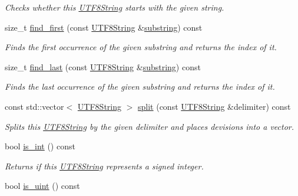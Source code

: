 \begin{DoxyCompactItemize}
\begin{DoxyCompactList}\small\item\em Checks whether this \hyperlink{classchaos_1_1str_1_1_u_t_f8_string}{U\-T\-F8\-String} starts with the given string. \end{DoxyCompactList}\item 
size\-\_\-t \hyperlink{classchaos_1_1str_1_1_u_t_f8_string_a035c9c2a40bcac212ebb20a8524d0b5a}{find\-\_\-first} (const \hyperlink{classchaos_1_1str_1_1_u_t_f8_string}{U\-T\-F8\-String} \&\hyperlink{classchaos_1_1str_1_1_u_t_f8_string_a2d50ab58715264ae175f521816bf670c}{substring}) const 
\begin{DoxyCompactList}\small\item\em Finds the first occurrence of the given substring and returns the index of it. \end{DoxyCompactList}\item 
size\-\_\-t \hyperlink{classchaos_1_1str_1_1_u_t_f8_string_a4053c128303a753735295b441e439933}{find\-\_\-last} (const \hyperlink{classchaos_1_1str_1_1_u_t_f8_string}{U\-T\-F8\-String} \&\hyperlink{classchaos_1_1str_1_1_u_t_f8_string_a2d50ab58715264ae175f521816bf670c}{substring}) const 
\begin{DoxyCompactList}\small\item\em Finds the last occurrence of the given substring and returns the index of it. \end{DoxyCompactList}\item 
const std\-::vector$<$ \hyperlink{classchaos_1_1str_1_1_u_t_f8_string}{U\-T\-F8\-String} $>$ \hyperlink{classchaos_1_1str_1_1_u_t_f8_string_ac5da4c989f6394c38b0fb82a252099db}{split} (const \hyperlink{classchaos_1_1str_1_1_u_t_f8_string}{U\-T\-F8\-String} \&delimiter) const 
\begin{DoxyCompactList}\small\item\em Splits this \hyperlink{classchaos_1_1str_1_1_u_t_f8_string}{U\-T\-F8\-String} by the given delimiter and places devisions into a vector. \end{DoxyCompactList}\item 
\hypertarget{classchaos_1_1str_1_1_u_t_f8_string_a64f529f30034281560805b97826c5e13}{bool \hyperlink{classchaos_1_1str_1_1_u_t_f8_string_a64f529f30034281560805b97826c5e13}{is\-\_\-int} () const }\label{classchaos_1_1str_1_1_u_t_f8_string_a64f529f30034281560805b97826c5e13}

\begin{DoxyCompactList}\small\item\em Returns if this \hyperlink{classchaos_1_1str_1_1_u_t_f8_string}{U\-T\-F8\-String} represents a signed integer. \end{DoxyCompactList}\item 
\hypertarget{classchaos_1_1str_1_1_u_t_f8_string_a989763da3e7eed8664cd2e5c41ea7e00}{bool \hyperlink{classchaos_1_1str_1_1_u_t_f8_string_a989763da3e7eed8664cd2e5c41ea7e00}{is\-\_\-uint} () const }\label{classchaos_1_1str_1_1_u_t_f8_string_a989763da3e7eed8664cd2e5c41ea7e00}


\end{DoxyCompactItemize}

